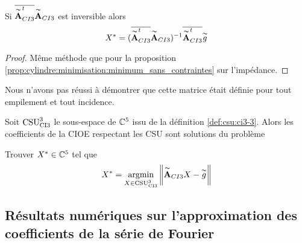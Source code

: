     \begin{prop}
      Si \(\conj{\tilde{\mA}_{CI3}^t}\tilde{\mA}_{CI3}\) est inversible alors
      \begin{equation*}
        X^* = (\conj{\tilde{\mA}_{CI3}^t}\tilde{\mA}_{CI3})^{-1}\conj{\tilde{\mA}_{CI3}^t}\tilde{g}
      \end{equation*}
    \end{prop}
    \begin{proof}
      Même méthode que pour la proposition \ref{prop:cylindre:minimisation:minimum_sans_contraintes} sur l'impédance.
    \end{proof}

    Nous n'avons pas réussi à démontrer que cette matrice était définie pour tout empilement et tout incidence.

    \begin{thm}

      Soit \(\CSU[3]{CI3}\) le sous-espace de \(\CC^5\) issu de la définition \ref{def:csu:ci3-3}.
      Alors les coefficients de la CIOE respectant les CSU sont solutions du problème

      Trouver \(X^* \in \CC^5\) tel que
      \begin{equation*}
        X^* = \argmin{X\in \CSU[3]{CI3}} \norm{\tilde{\mA}_{CI3}X - \tilde{g}}
      \end{equation*}
    \end{thm}

    \subsection{Résultats numériques sur l'approximation des coefficients de la série de Fourier}
